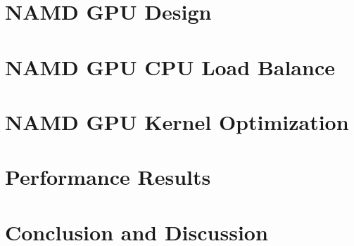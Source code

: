 \documentclass[11pt,onecolumn]{article}
\newcommand{\namd}{\textsc{namd}}
\begin{document}

\section{NAMD GPU Design } 


\section{NAMD GPU CPU Load Balance}



\section{NAMD GPU Kernel Optimization}


\section{Performance Results}


\section{Conclusion and Discussion}




\end{document}
